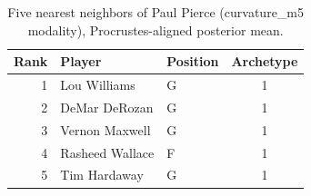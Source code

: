\begin{table}[htbp]
  \centering\small
  \begin{tabular}{rllc}
    \toprule
    Rank & Player & Position & Archetype \\
    \midrule
    1 & Lou Williams & G & 1 \\
    2 & DeMar DeRozan & G & 1 \\
    3 & Vernon Maxwell & G & 1 \\
    4 & Rasheed Wallace & F & 1 \\
    5 & Tim Hardaway & G & 1 \\
    \bottomrule
  \end{tabular}
  \caption{Five nearest neighbors of Paul Pierce (curvature_m5 modality), Procrustes-aligned posterior mean.}
  \label{tab:Paul_Pierce_neighbors_curvature_m5}
\end{table}

